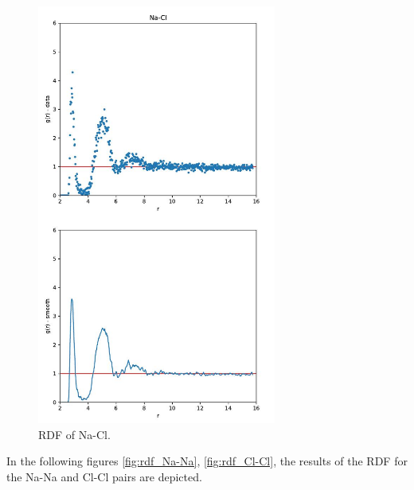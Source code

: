 \documentclass[10pt]{article}
\begin{document}
        \begin{figure}[H]
            \centering
            \includegraphics[width = 0.7\textwidth]{RDF-NaCl.jpg}
            \caption{RDF of Na-Cl.}
            \label{fig:rdf_Na-Cl}
        \end{figure}

        In the following figures \ref{fig:rdf_Na-Na}, \ref{fig:rdf_Cl-Cl}, the results of the RDF for the Na-Na and Cl-Cl pairs are depicted.
\end{document}
